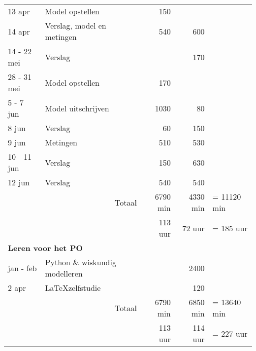 \documentclass[a4paper]{article}
\begin{document}
\begin{table}[h]
\begin{tabular}{|l|l|r|r|l}
			13 apr  & Model opstellen          & 150       &           & \\ \cline{1-4}
			14 apr  & Verslag, model en metingen & 540     & 600       & \\ \cline{1-4}
			14 - 22 mei  & Verslag             &           & 170       & \\ \cline{1-4}
			28 - 31 mei & Model opstellen      & 170       &           & \\ \cline{1-4}
			5 - 7 jun & Model uitschrijven     & 1030      & 80        & \\ \cline{1-4}
			8 jun   & Verslag                  & 60        & 150       & \\ \cline{1-4}
			9 jun   & Metingen                 & 510       & 530       & \\ \cline{1-4}
			10 - 11 jun & Verslag              & 150       & 630       & \\ \cline{1-4}
			12 jun  & Verslag                  & 540       & 540       & \\ \hline \hline
			\multicolumn{2}{r|}{Totaal}        & 6790 min  & 4330 min  & = 11120 min \\ \cline{3-4}
			\multicolumn{2}{r|}{}              & 113 uur   & 72 uur    & = 185 uur\\ \cline{3-4}
			\multicolumn{4}{l}{\textbf{Leren voor het PO}} & \\ \cline{1-4}
			jan - feb & Python \& wiskundig modelleren &   & 2400      & \\ \cline{1-4}
			2 apr  & \LaTeX \space zelfstudie &            & 120       & \\ \hline \hline
			\multicolumn{2}{r|}{Totaal}       & 6790 min   & 6850 min  & = 13640 min \\ \cline{3-4}
			\multicolumn{2}{r|}{}             & 113 uur    & 114 uur   & = 227 uur \\ \cline{3-4}
		\end{tabular}
	\end{table}
	
	\clearpage
\end{document}
